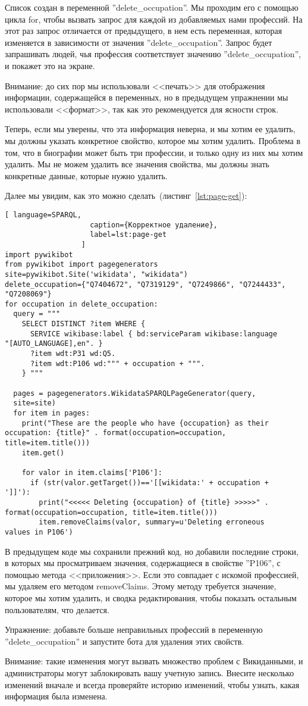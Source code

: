 Список создан в переменной ''delete\_occupation''. Мы проходим его с помощью цикла for, чтобы вызвать запрос для каждой из добавляемых нами профессий. На этот раз запрос отличается от предыдущего, в нем есть переменная, которая изменяется в зависимости от значения ''delete\_occupation''. Запрос будет запрашивать людей, чья профессия соответствует значению ''delete\_occupation'', и покажет это на экране.

Внимание: до сих пор мы использовали <<печать>> для отображения информации, содержащейся в переменных, но в предыдущем упражнении мы использовали <<формат>>, так как это рекомендуется для ясности строк.

Теперь, если мы уверены, что эта информация неверна, и мы хотим ее удалить, мы должны указать конкретное свойство, которое мы хотим удалить. Проблема в том, что в биографии может быть три профессии, и только одну из них мы хотим удалить. Мы не можем удалить все значения свойства, мы должны знать конкретные данные, которые нужно удалить.

Далее мы увидим, как это можно сделать~(листинг~\ref{lst:page-get}):

\begin{lstlisting}[ language=SPARQL,
                    caption={Корректное удаление},
                    label=lst:page-get
                  ]
import pywikibot
from pywikibot import pagegenerators
site=pywikibot.Site('wikidata', "wikidata")
delete_occupation={"Q7404672", "Q7319129", "Q7249866", "Q7244433", 
"Q7208069"}
for occupation in delete_occupation:
  query = """
    SELECT DISTINCT ?item WHERE {
      SERVICE wikibase:label { bd:serviceParam wikibase:language 
"[AUTO_LANGUAGE],en". }
      ?item wdt:P31 wd:Q5.
      ?item wdt:P106 wd:""" + occupation + """.
    } """

  pages = pagegenerators.WikidataSPARQLPageGenerator(query, 
  site=site)
  for item in pages:
    print("These are the people who have {occupation} as their 
occupation: {title}" . format(occupation=occupation, 
title=item.title()))
    item.get()

    for valor in item.claims['P106']:
      if (str(valor.getTarget())=='[[wikidata:' + occupation + 
']]'):
        print("<<<<< Deleting {occupation} of {title} >>>>>" . 
format(occupation=occupation, title=item.title()))
        item.removeClaims(valor, summary=u'Deleting erroneous 
values in P106')
\end{lstlisting} 

В предыдущем коде мы сохранили прежний код, но добавили последние строки, в которых мы просматриваем значения, содержащиеся в свойстве ''P106'', с помощью метода <<приложения>>. Если это совпадает с искомой профессией, мы удаляем его методом removeClaims. Этому методу требуется значение, которое мы хотим удалить, и сводка редактирования, чтобы показать остальным пользователям, что делается.

Упражнение: добавьте больше неправильных профессий в переменную ''delete\_occupation'' и запустите бота для удаления этих свойств.

Внимание: такие изменения могут вызвать множество проблем с Викиданными, и администраторы могут заблокировать вашу учетную запись. Внесите несколько изменений вначале и всегда проверяйте историю изменений, чтобы узнать, какая информация была изменена.

